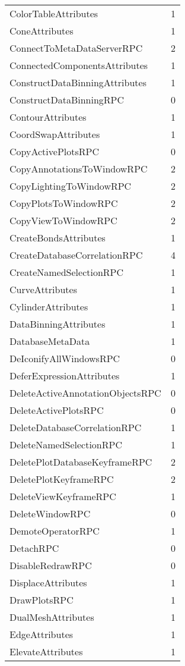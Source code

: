 \documentclass[10pt,a4paper]{report}
\begin{document}
\begin{longtable}{ll}
ColorTableAttributes & 1 \\
ConeAttributes & 1 \\
ConnectToMetaDataServerRPC & 2 \\
ConnectedComponentsAttributes & 1 \\
ConstructDataBinningAttributes & 1 \\
ConstructDataBinningRPC & 0 \\
ContourAttributes & 1 \\
CoordSwapAttributes & 1 \\
CopyActivePlotsRPC & 0 \\
CopyAnnotationsToWindowRPC & 2 \\
CopyLightingToWindowRPC & 2 \\
CopyPlotsToWindowRPC & 2 \\
CopyViewToWindowRPC & 2 \\
CreateBondsAttributes & 1 \\
CreateDatabaseCorrelationRPC & 4 \\
CreateNamedSelectionRPC & 1 \\
CurveAttributes & 1 \\
CylinderAttributes & 1 \\
DataBinningAttributes & 1 \\
DatabaseMetaData & 1 \\
DeIconifyAllWindowsRPC & 0 \\
DeferExpressionAttributes & 1 \\
DeleteActiveAnnotationObjectsRPC & 0 \\
DeleteActivePlotsRPC & 0 \\
DeleteDatabaseCorrelationRPC & 1 \\
DeleteNamedSelectionRPC & 1 \\
DeletePlotDatabaseKeyframeRPC & 2 \\
DeletePlotKeyframeRPC & 2 \\
DeleteViewKeyframeRPC & 1 \\
DeleteWindowRPC & 0 \\
DemoteOperatorRPC & 1 \\
DetachRPC & 0 \\
DisableRedrawRPC & 0 \\
DisplaceAttributes & 1 \\
DrawPlotsRPC & 1 \\
DualMeshAttributes & 1 \\
EdgeAttributes & 1 \\
ElevateAttributes & 1 \\

\end{longtable}
\end{document}
